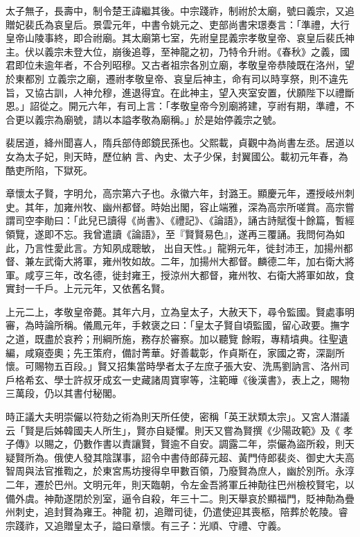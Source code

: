 \begin{pinyinscope}
 太子無子，長壽中，制令楚王諱繼其後。中宗踐祚，制祔於太廟，號曰義宗，又追贈妃裴氏為哀皇后。景雲元年，中書令姚元之、吏部尚書宋璟奏言：「準禮，大行皇帝山陵事終，即合祔廟。其太廟第七室，先祔皇昆義宗孝敬皇帝、哀皇后裴氏神主。伏以義宗未登大位，崩後追尊，至神龍之初，乃特令升祔。《春秋》之義，國君即位未逾年者，不合列昭穆。又古者祖宗各別立廟，孝敬皇帝恭陵既在洛州，望於東都別
 立義宗之廟，遷祔孝敬皇帝、哀皇后神主，命有司以時享祭，則不違先旨，又協古訓，人神允穆，進退得宜。在此神主，望入夾室安置，伏願陛下以禮斷恩。」詔從之。開元六年，有司上言：「孝敬皇帝今別廟將建，亨祔有期，準禮，不合更以義宗為廟號，請以本謚孝敬為廟稱。」於是始停義宗之號。



 裴居道，絳州聞喜人，隋兵部侍郎鏡民孫也。父熙載，貞觀中為尚書左丞。居道以女為太子妃，則天時，歷位納
 言、內史、太子少保，封翼國公。載初元年春，為酷吏所陷，下獄死。



 章懷太子賢，字明允，高宗第六子也。永徽六年，封潞王。顯慶元年，遷授岐州刺史。其年，加雍州牧、幽州都督。時始出閣，容止端雅，深為高宗所嗟賞。高宗嘗謂司空李勛曰：「此兒已讀得《尚書》、《禮記》、《論語》，誦古詩賦復十餘篇，暫經領覽，遂即不忘。我曾遣讀《論語》，至『賢賢易色』，遂再三覆誦。我問何為如此，乃言性愛此言。方知夙成聰敏，
 出自天性。」龍朔元年，徙封沛王，加揚州都督、兼左武衛大將軍，雍州牧如故。二年，加揚州大都督。麟德二年，加右衛大將軍。咸亨三年，改名德，徙封雍王，授涼州大都督，雍州牧、右衛大將軍如故，食實封一千戶。上元元年，又依舊名賢。



 上元二上，孝敬皇帝薨。其年六月，立為皇太子，大赦天下，尋令監國。賢處事明審，為時論所稱。儀鳳元年，手敕褒之曰：「皇太子賢自頃監國，留心政要。撫字之道，既盡於哀矜；刑綱所施，務存於審察。加以聽覽
 餘暇，專精墳典。往聖遺編，咸窺壺奧；先王策府，備討菁華。好善載彰，作貞斯在，家國之寄，深副所懷。可賜物五百段。」賢又招集當時學者太子左庶子張大安、洗馬劉訥言、洛州司戶格希玄、學士許叔牙成玄一史藏諸周寶寧等，注範曄《後漢書》，表上之，賜物三萬段，仍以其書付秘閣。



 時正議大夫明崇儼以符劾之術為則天所任使，密稱「英王狀類太宗」。又宮人潛議云「賢是后姊韓國夫人所生」，賢亦自疑懼。則天又嘗為賢撰《少陽政範》及《
 孝子傳》以賜之，仍數作書以責讓賢，賢逾不自安。調露二年，崇儼為盜所殺，則天疑賢所為。俄使人發其陰謀事，詔令中書侍郎薛元超、黃門侍郎裴炎、御史大夫高智周與法官推鞫之，於東宮馬坊搜得皁甲數百領，乃廢賢為庶人，幽於別所。永淳二年，遷於巴州。文明元年，則天臨朝，令左金吾將軍丘神勣往巴州檢校賢宅，以備外虞。神勣遂閉於別室，逼令自殺，年三十二。則天舉哀於顯福門，貶神勣為疊州刺史，追封賢為雍王。神龍
 初，追贈司徒，仍遣使迎其喪柩，陪葬於乾陵。睿宗踐祚，又追贈皇太子，謚曰章懷。有三子：光順、守禮、守義。




\end{pinyinscope}
